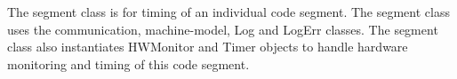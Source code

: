 %



The segment class is for timing of an individual code segment.
The segment class uses the communication, machine-model,
Log and LogErr classes. The segment class also instantiates
HWMonitor and Timer objects to handle hardware monitoring and
timing of this code segment.

